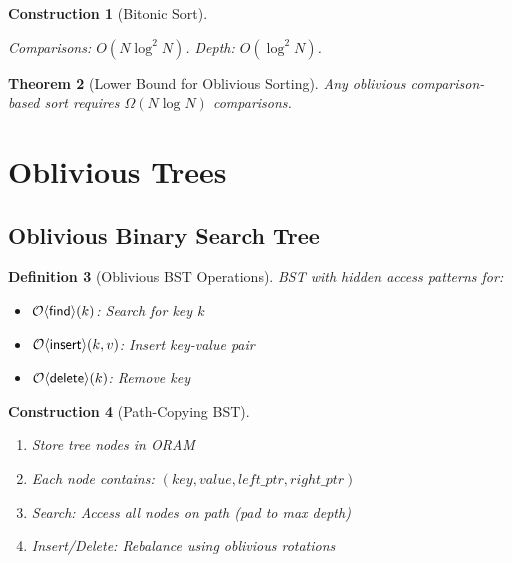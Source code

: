 \documentclass[11pt,final,hidelinks]{article}
\newcommand{\Insert}{\mathsf{insert}}
\newcommand{\Delete}{\mathsf{delete}}
\newcommand{\Find}{\mathsf{find}}
\newtheorem{theorem}{Theorem}[section]
\newtheorem{definition}[theorem]{Definition}
\newtheorem{construction}[theorem]{Construction}
\begin{document}
\begin{construction}[Bitonic Sort]
\begin{algorithm}[H]
\caption{Bitonic Sort (Oblivious)}
\end{algorithm}
Comparisons: $O(N \log^2 N)$. Depth: $O(\log^2 N)$.
\end{construction}

\begin{theorem}[Lower Bound for Oblivious Sorting]
Any oblivious comparison-based sort requires $\Omega(N \log N)$ comparisons.
\end{theorem}

\section{Oblivious Trees}

\subsection{Oblivious Binary Search Tree}

\begin{definition}[Oblivious BST Operations]
BST with hidden access patterns for:
\begin{itemize}
    \item $\Obv{\Find}(k)$: Search for key $k$
    \item $\Obv{\Insert}(k, v)$: Insert key-value pair
    \item $\Obv{\Delete}(k)$: Remove key
\end{itemize}
\end{definition}

\begin{construction}[Path-Copying BST]
\begin{enumerate}
    \item Store tree nodes in ORAM
    \item Each node contains: $(key, value, left\_ptr, right\_ptr)$
    \item Search: Access all nodes on path (pad to max depth)
    \item Insert/Delete: Rebalance using oblivious rotations
\end{enumerate}
\end{construction}
\end{document}
